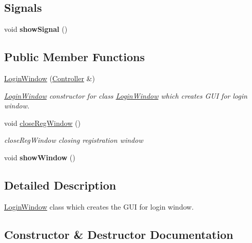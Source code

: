 \subsection*{Signals}
\begin{DoxyCompactItemize}
\item 
void {\bfseries show\+Signal} ()\hypertarget{classLoginWindow_a27cf306a0fd680afd528c016f2df8926}{}\label{classLoginWindow_a27cf306a0fd680afd528c016f2df8926}

\end{DoxyCompactItemize}
\subsection*{Public Member Functions}
\begin{DoxyCompactItemize}
\item 
\hyperlink{classLoginWindow_ad3f4ec97bdb1fd55e3e6f6f25112f9d8}{Login\+Window} (\hyperlink{classController}{Controller} \&)
\begin{DoxyCompactList}\small\item\em \hyperlink{classLoginWindow}{Login\+Window} constructor for class \hyperlink{classLoginWindow}{Login\+Window} which creates G\+UI for login window. \end{DoxyCompactList}\item 
void \hyperlink{classLoginWindow_a1d429ebfb0f2ebb21591b209da5d4ecb}{close\+Reg\+Window} ()
\begin{DoxyCompactList}\small\item\em close\+Reg\+Window closing registration window \end{DoxyCompactList}\item 
void {\bfseries show\+Window} ()\hypertarget{classLoginWindow_aea3395f2cf27b324b226af426f84514f}{}\label{classLoginWindow_aea3395f2cf27b324b226af426f84514f}

\end{DoxyCompactItemize}


\subsection{Detailed Description}
\hyperlink{classLoginWindow}{Login\+Window} class which creates the G\+UI for login window. 

\subsection{Constructor \& Destructor Documentation}

